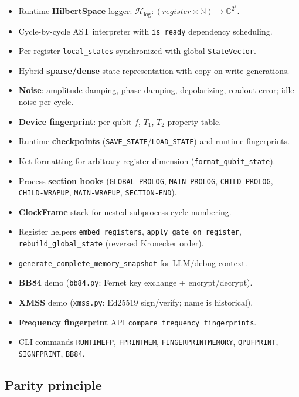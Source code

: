 \documentclass[11pt,a4paper]{article}
\newcommand{\C}{\mathbb{C}}
\newcommand{\HS}{\mathcal{H}_{\mathrm{log}}}
\begin{document}
\begin{itemize}[noitemsep]
  \item Runtime \textbf{HilbertSpace} logger: $\HS\colon (\mathit{register}\times\mathbb{N})\to\C^{2^k}$.
  \item Cycle-by-cycle AST interpreter with \texttt{is\_ready} dependency scheduling.
  \item Per-register \texttt{local\_states} synchronized with global \texttt{StateVector}.
  \item Hybrid \textbf{sparse/dense} state representation with copy-on-write generations.
  \item \textbf{Noise}: amplitude damping, phase damping, depolarizing, readout error; idle noise per cycle.
  \item \textbf{Device fingerprint}: per-qubit $f$, $T_1$, $T_2$ property table.
  \item Runtime \textbf{checkpoints} (\texttt{SAVE\_STATE}/\texttt{LOAD\_STATE}) and runtime fingerprints.
  \item Ket formatting for arbitrary register dimension (\texttt{format\_qubit\_state}).
  \item Process \textbf{section hooks} (\texttt{GLOBAL-PROLOG}, \texttt{MAIN-PROLOG}, \texttt{CHILD-PROLOG}, \texttt{CHILD-WRAPUP}, \texttt{MAIN-WRAPUP}, \texttt{SECTION-END}).
  \item \textbf{ClockFrame} stack for nested subprocess cycle numbering.
  \item Register helpers \texttt{embed\_registers}, \texttt{apply\_gate\_on\_register}, \texttt{rebuild\_global\_state} (reversed Kronecker order).
  \item \texttt{generate\_complete\_memory\_snapshot} for LLM/debug context.
  \item \textbf{BB84} demo (\texttt{bb84.py}: Fernet key exchange + encrypt/decrypt).
  \item \textbf{XMSS} demo (\texttt{xmss.py}: Ed25519 sign/verify; name is historical).
  \item \textbf{Frequency fingerprint} API \texttt{compare\_frequency\_fingerprints}.
  \item CLI commands \texttt{RUNTIMEFP}, \texttt{FPRINTMEM}, \texttt{FINGERPRINTMEMORY}, \texttt{QPUFPRINT}, \texttt{SIGNFPRINT}, \texttt{BB84}.
\end{itemize}

\subsection{Parity principle}
\end{document}

